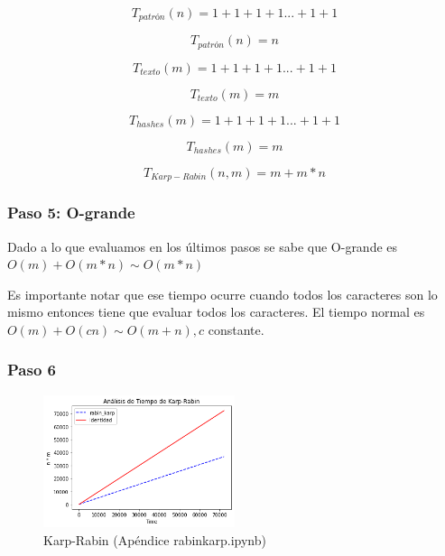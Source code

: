 \[T_{patrón}(n) = 1 + 1 + 1 + 1 ... + 1 + 1\]

\[T_{patrón}(n) = n \]

\[T_{texto}(m) = 1 + 1 + 1 + 1 ... + 1 + 1\]

\[T_{texto}(m) = m \]

\[T_{hashes}(m) = 1 + 1 + 1 + 1 ... + 1 + 1\]

\[T_{hashes}(m) = m \]

\[T_{Karp-Rabin}(n,m) = m + m * n\]

\subsubsection*{Paso 5: O-grande}

Dado a lo que evaluamos en los últimos pasos se sabe que O-grande es $O(m) + O(m*n) \sim O(m*n)$

Es importante notar que ese tiempo ocurre cuando todos los caracteres son lo mismo entonces tiene que evaluar todos los caracteres. El tiempo normal es $O(m) + O(cn) \sim O(m+n), c$ constante.


\subsubsection*{Paso 6}
\begin{figure} [H]
    \includegraphics[width=0.5\textwidth]{../codigoPythonJupyter/rk/Final.png}
    \caption{Karp-Rabin (Apéndice rabinkarp.ipynb)}
    \label{fig:kr}
\end{figure}
